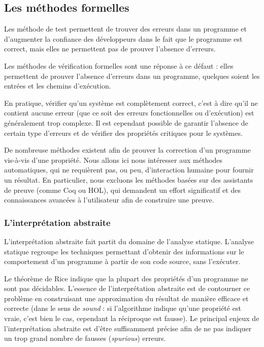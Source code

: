 \subsection{Les méthodes formelles}

Les méthode de test permettent de trouver des erreurs dans un programme
et d'augmenter la confiance des développeurs dans le fait que le
programme est correct, mais elles ne permettent pas de prouver l'absence
d'erreurs.

Les méthodes de vérification formelles sont une réponse à ce défaut :
elles permettent de prouver l'absence d'erreurs dans un programme,
quelques soient les entrées et les chemins d'exécution.

En pratique, vérifier qu'un système est complètement correct, c'est à
dire qu'il ne contient aucune erreur (que ce soit des erreurs
fonctionnelles ou d'exécution) est généralement trop complexe. Il est
cependant possible de garantir l'absence de certain type d'erreurs et de
vérifier des propriétés critiques pour le systèmes.

De nombreuse méthodes existent afin de prouver la correction d'un
programme vis-à-vis d'une propriété. Nous allons ici nous intéresser aux
méthodes automatiques, qui ne requièrent pas, ou peu, d'interaction
humaine pour fournir un résultat. En particulier, nous excluons les
méthodes basées sur des assistants de preuve (comme Coq ou HOL), qui
demandent un effort significatif et des connaissances avancées à
l'utilisateur afin de construire une preuve.

\subsubsection{L'interprétation abstraite}

L'interprétation abstraite fait partit du domaine de l'analyse statique.
L'analyse statique regroupe les techniques permettant d'obtenir des
informations sur le comportement d'un programme à partir de son code
source, sans l'exécuter.

Le théorème de Rice indique que la plupart des propriétés d'un programme
ne sont pas décidables. L'essence de l'interprétation abstraite est de
contourner ce problème en construisant une approximation du résultat de
manière efficace et correcte (dans le sens de \emph{sound} : si
l'algorithme indique qu'une propriété est vraie, c'est bien le cas,
cependant la réciproque est fausse). Le principal enjeux de
l'interprétation abstraite est d'être suffisamment précise afin de ne
pas indiquer un trop grand nombre de fausses (\emph{spurious}) erreurs.

